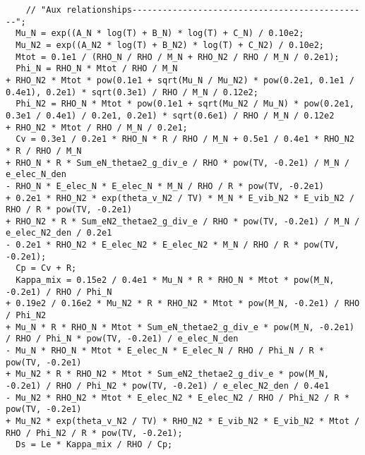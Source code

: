 \documentclass[10pt]{article}
\begin{document}
\begin{scriptsize}
\begin{verbatim}
    // "Aux relationships-----------------------------------------------";
  Mu_N = exp((A_N * log(T) + B_N) * log(T) + C_N) / 0.10e2;
  Mu_N2 = exp((A_N2 * log(T) + B_N2) * log(T) + C_N2) / 0.10e2;
  Mtot = 0.1e1 / (RHO_N / RHO / M_N + RHO_N2 / RHO / M_N / 0.2e1);
  Phi_N = RHO_N * Mtot / RHO / M_N 
+ RHO_N2 * Mtot * pow(0.1e1 + sqrt(Mu_N / Mu_N2) * pow(0.2e1, 0.1e1 / 0.4e1), 0.2e1) * sqrt(0.3e1) / RHO / M_N / 0.12e2;
  Phi_N2 = RHO_N * Mtot * pow(0.1e1 + sqrt(Mu_N2 / Mu_N) * pow(0.2e1, 0.3e1 / 0.4e1) / 0.2e1, 0.2e1) * sqrt(0.6e1) / RHO / M_N / 0.12e2 
+ RHO_N2 * Mtot / RHO / M_N / 0.2e1;
  Cv = 0.3e1 / 0.2e1 * RHO_N * R / RHO / M_N + 0.5e1 / 0.4e1 * RHO_N2 * R / RHO / M_N 
+ RHO_N * R * Sum_eN_thetae2_g_div_e / RHO * pow(TV, -0.2e1) / M_N / e_elec_N_den 
- RHO_N * E_elec_N * E_elec_N * M_N / RHO / R * pow(TV, -0.2e1) 
+ 0.2e1 * RHO_N2 * exp(theta_v_N2 / TV) * M_N * E_vib_N2 * E_vib_N2 / RHO / R * pow(TV, -0.2e1) 
+ RHO_N2 * R * Sum_eN2_thetae2_g_div_e / RHO * pow(TV, -0.2e1) / M_N / e_elec_N2_den / 0.2e1 
- 0.2e1 * RHO_N2 * E_elec_N2 * E_elec_N2 * M_N / RHO / R * pow(TV, -0.2e1);
  Cp = Cv + R;
  Kappa_mix = 0.15e2 / 0.4e1 * Mu_N * R * RHO_N * Mtot * pow(M_N, -0.2e1) / RHO / Phi_N 
+ 0.19e2 / 0.16e2 * Mu_N2 * R * RHO_N2 * Mtot * pow(M_N, -0.2e1) / RHO / Phi_N2 
+ Mu_N * R * RHO_N * Mtot * Sum_eN_thetae2_g_div_e * pow(M_N, -0.2e1) / RHO / Phi_N * pow(TV, -0.2e1) / e_elec_N_den 
- Mu_N * RHO_N * Mtot * E_elec_N * E_elec_N / RHO / Phi_N / R * pow(TV, -0.2e1) 
+ Mu_N2 * R * RHO_N2 * Mtot * Sum_eN2_thetae2_g_div_e * pow(M_N, -0.2e1) / RHO / Phi_N2 * pow(TV, -0.2e1) / e_elec_N2_den / 0.4e1 
- Mu_N2 * RHO_N2 * Mtot * E_elec_N2 * E_elec_N2 / RHO / Phi_N2 / R * pow(TV, -0.2e1) 
+ Mu_N2 * exp(theta_v_N2 / TV) * RHO_N2 * E_vib_N2 * E_vib_N2 * Mtot / RHO / Phi_N2 / R * pow(TV, -0.2e1);
  Ds = Le * Kappa_mix / RHO / Cp;


\end{verbatim}
\end{scriptsize}
\end{document}

